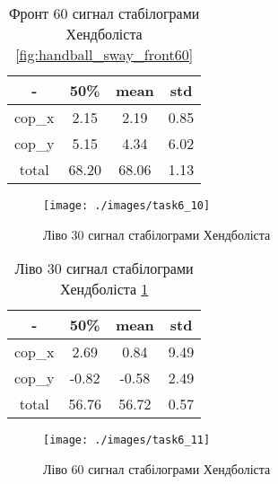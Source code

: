 \begin{table}[!ht]
    \centering
    \caption{Фронт 60 сигнал стабілограми Хендболіста \ref{fig:handball_sway_front60}}
    \label{tab:handball_sway_front60}

    \begin{tabular}{|c|c|c|c|}
        \toprule
        -      & 50\%  & mean  & std  \\

        \midrule
        cop\_x & 2.15  & 2.19  & 0.85 \\
        \hline
        cop\_y & 5.15  & 4.34  & 6.02 \\

        \bottomrule
        total  & 68.20 & 68.06 & 1.13 \\
        \hline
    \end{tabular}
\end{table}

\begin{figure}[!ht]
    \centering
    \texttt{[image: ./images/task6\_10]}
    \caption{Ліво 30 сигнал стабілограми Хендболіста}
    \label{fig:handball_sway_left30}
\end{figure}

\begin{table}[!ht]
    \centering
    \caption{Ліво 30 сигнал стабілограми Хендболіста \ref{fig:handball_sway_left30}}
    \label{tab:handball_sway_left30}

    \begin{tabular}{|c|c|c|c|}
        \toprule
        -      & 50\%  & mean  & std  \\

        \midrule
        cop\_x & 2.69  & 0.84  & 9.49 \\
        \hline
        cop\_y & -0.82 & -0.58 & 2.49 \\

        \bottomrule
        total  & 56.76 & 56.72 & 0.57 \\
        \hline
    \end{tabular}
\end{table}

\begin{figure}[!ht]
    \centering
    \texttt{[image: ./images/task6\_11]}
    \caption{Ліво 60 сигнал стабілограми Хендболіста}
    \label{fig:handball_sway_left60}
\end{figure}

